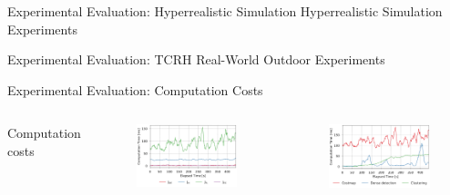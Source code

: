 \documentclass[10pt]{beamer}
\begin{document}
    \begin{frame}{Experimental Evaluation: Hyperrealistic Simulation}
        Hyperrealistic Simulation Experiments
    \end{frame}

    \begin{frame}{Experimental Evaluation: TCRH}
        Real-World Outdoor Experiments
    \end{frame}

    \begin{frame}{Experimental Evaluation: Computation Costs}
        \begin{columns}[c,onlytextwidth]
                Computation costs

                \vspace{0.4cm}
                \begin{figure}
                    \centering
                    \includegraphics[width=\textwidth]{images/Fig8a.png}
                \end{figure}
                \vspace{-0.8cm}
                \begin{figure}
                    \centering
                    \includegraphics[width=\textwidth]{images/Fig8b.png}
                \end{figure}
        \end{columns}
    \end{frame}
\end{document}
